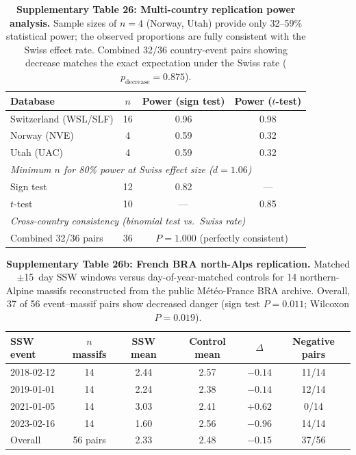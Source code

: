 \documentclass[11pt,letterpaper]{article}
\begin{document}
\begin{table}[!ht]
\centering
\caption{\textbf{Supplementary Table 26: Multi-country replication power analysis.}
Sample sizes of $n = 4$ (Norway, Utah) provide only 32--59\% statistical power; the observed proportions are fully consistent with the Swiss effect rate. Combined 32/36 country-event pairs showing decrease matches the exact expectation under the Swiss rate ($p_{\mathrm{decrease}} = 0.875$).}
\label{tab:power}
\small
\begin{tabular}{lccc}
\toprule
Database & $n$ & Power (sign test) & Power ($t$-test) \\
\midrule
Switzerland (WSL/SLF) & 16 & 0.96 & 0.98 \\
Norway (NVE) & 4 & 0.59 & 0.32 \\
Utah (UAC) & 4 & 0.59 & 0.32 \\
\midrule
\multicolumn{4}{l}{\textit{Minimum $n$ for 80\% power at Swiss effect size ($d = 1.06$)}} \\
Sign test & 12 & 0.82 & --- \\
$t$-test & 10 & --- & 0.85 \\
\midrule
\multicolumn{4}{l}{\textit{Cross-country consistency (binomial test vs.\ Swiss rate)}} \\
Combined 32/36 pairs & 36 & \multicolumn{2}{c}{$P = 1.000$ (perfectly consistent)} \\
\bottomrule
\end{tabular}
\end{table}

\begin{table}[!ht]
\centering
\caption{\textbf{Supplementary Table 26b: French BRA north-Alps replication.}
Matched $\pm$15~day SSW windows versus day-of-year-matched controls for 14 northern-Alpine massifs reconstructed from the public M\'et\'eo-France BRA archive. Overall, 37 of 56 event--massif pairs show decreased danger (sign test $P = 0.011$; Wilcoxon $P = 0.019$).}
\label{tab:french_bra}
\small
\begin{tabular}{lccccc}
\toprule
SSW event & $n$ massifs & SSW mean & Control mean & $\Delta$ & Negative pairs \\
\midrule
2018-02-12 & 14 & 2.44 & 2.57 & $-0.14$ & 11/14 \\
2019-01-01 & 14 & 2.24 & 2.38 & $-0.14$ & 12/14 \\
2021-01-05 & 14 & 3.03 & 2.41 & $+0.62$ & 0/14 \\
2023-02-16 & 14 & 1.60 & 2.56 & $-0.96$ & 14/14 \\
\midrule
Overall & 56 pairs & 2.33 & 2.48 & $-0.15$ & 37/56 \\
\bottomrule
\end{tabular}
\end{table}
\end{document}
